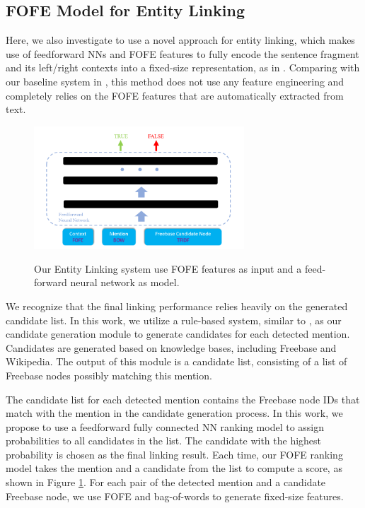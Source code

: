 \documentclass[11pt]{article}
\begin{document}
\subsection{FOFE Model for Entity Linking}

Here, we also investigate to use a novel approach for entity linking, which makes use of feedforward NNs and FOFE features \cite{zhang2015fixed} to fully encode the sentence fragment and its left/right contexts into a fixed-size
representation, as in \cite{xu2017local}. Comparing with our baseline system in \cite{kbp2016iflytek}, this method does not use any feature engineering and completely relies on the FOFE features that are automatically extracted from text. 

\begin{figure}[h]
  \centering
  \includegraphics[width=0.7\textwidth]{FOFE-Entity-Linking.png}\\
  \caption{Our Entity Linking system use FOFE features as input and a feed-forward neural network as model.}\label{FOFE-DL-fg:2}
\end{figure}

We recognize that the final linking performance relies heavily  on the generated candidate list. In this
work, we utilize a rule-based system, similar to \cite{kbp2016iflytek}, as our candidate generation module to generate
candidates for each detected mention. Candidates
are generated based on knowledge bases,
including Freebase and Wikipedia. The output of
this module is a candidate list, consisting of a list
of Freebase nodes possibly matching this mention.

The candidate list for each detected mention contains
the Freebase node IDs that match with the
mention in the candidate generation process. In
this work, we propose to use a feedforward fully connected
NN ranking model to assign probabilities
to all candidates in the list. The candidate
with the highest probability is chosen as the final
linking result. Each time, our FOFE ranking model
takes the mention and a candidate from the list
to compute a score, as shown in Figure \ref{FOFE-DL-fg:2}. For each pair of the detected mention and a candidate Freebase node, we use FOFE and bag-of-words to generate fixed-size features.
\end{document}
